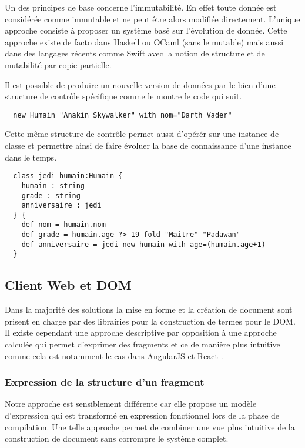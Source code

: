 \documentclass[twoside,a4paper]{article}
\begin{document}
Un  des principes  de base  concerne l'immutabilité.   En effet  toute
donnée est considérée  comme immutable et ne peut  être alors modifiée
directement. L'unique approche consiste à proposer un système basé sur
l'évolution de donnée. Cette approche  existe de facto dans Haskell ou
OCaml (sans  le mutable)  mais aussi dans  des langages  récents comme
Swift \cite{Swift}  avec la notion  de structure et de  mutabilité par
copie partielle.

Il est possible de produire un nouvelle version de données par le bien
d'une structure  de contrôle  spécifique comme le  montre le  code qui
suit.

\lstset{language=Thicket}
\begin{lstlisting}
  new Humain "Anakin Skywalker" with nom="Darth Vader"
\end{lstlisting}

Cette  même  structure  de  contrôle permet  aussi  d'opérér  sur  une
instance de  classe et  permettre ainsi  de faire  évoluer la  base de
connaissance d'une instance dans le temps.

\lstset{language=Thicket}
\begin{lstlisting}
  class jedi humain:Humain {
    humain : string
    grade : string
    anniversaire : jedi
  } {
    def nom = humain.nom
    def grade = humain.age ?> 19 fold "Maitre" "Padawan"
    def anniversaire = jedi new humain with age=(humain.age+1)
  }
\end{lstlisting}

\subsection{Client Web et DOM}

Dans la  majorité des  solutions la  mise en forme  et la  création de
document  sont   prisent  en  charge   par  des  librairies   pour  la
construction de termes  pour le DOM. Il existe  cependant une approche
descriptive  par  opposition  à   une  approche  calculée  qui  permet
d'exprimer des  fragments et ce  de manière plus intuitive  comme cela
est  notamment  le  cas   dans  AngularJS  \cite{angularjs}  et  React
\cite{react}.

\subsubsection{Expression de la structure d'un fragment}

Notre approche est sensiblement différente  car elle propose un modèle
d'expression qui est  transformé en expression fonctionnel  lors de la
phase de  compilation. Une telle  approche permet de combiner  une vue
plus  intuitive  de la  construction  de  document sans  corrompre  le
système complet.
\end{document}
